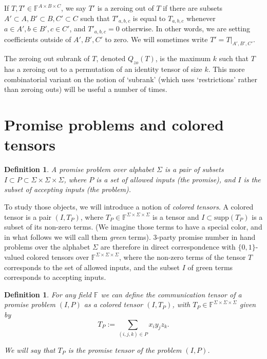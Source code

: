 \documentclass[10pt,a4paper]{article}
\newtheorem{definition}[theorem]{Definition}
\newcommand{\F}{\mathbb{F}}
\newcommand{\supp}{\mathrm{supp}}
\newcommand{\jnote}[1]{\todo[inline, color=blue!30!white]{#1 \\ -\textsc{Jarek}}}
\begin{document}
If $T,T' \in \F^{A \times B \times C}$, we say $T'$ is a zeroing out of $T$ if there are subsets $A' \subset A, B' \subset B, C' \subset C$ such that $T'_{a,b,c}$ is equal to $T_{a,b,c}$ whenever $a \in A', b \in B', c \in C'$, and $T'_{a,b,c} = 0$ otherwise. In other words, we are setting coefficients outside of $A',B',C'$ to zero. We will sometimes write $T' = T|_{A',B',C'}$.

The zeroing out subrank of $T$, denoted $Q_{zo}(T)$, is the maximum $k$ such that $T$ has a zeroing out to a permutation of an identity tensor of size $k$. This more combinatorial variant on the notion of `subrank' (which uses `restrictions' rather than zeroing outs) will be useful a number of times.

\section{Promise problems and colored tensors}


\begin{definition}
A promise problem over alphabet $\Sigma$ is a pair of subsets $I \subset P \subset \Sigma\times\Sigma\times\Sigma$, where $P$ is a set of allowed inputs (the \emph{promise}), and $I$ is the subset of accepting inputs (the \emph{problem}).
\end{definition}

To study those objects, we will introduce a notion of \emph{colored tensors}. A colored tensor is a pair $(I, T_P)$, where $T_P \in \F^{\Sigma \times \Sigma \times \Sigma}$ is a tensor and $I \subset \supp(T_P)$ is a subset of its non-zero terms. (We imagine those terms to have a special color, and in what follows we will call them \emph{green} terms). 3-party promise number in hand problems over the alphabet $\Sigma$ are therefore in direct correspondence with $\{0, 1\}$-valued colored tensors over $\F^{\Sigma \times \Sigma \times \Sigma}$, where the non-zero terms of the tensor $T$ corresponds to the set of allowed inputs, and the subset $I$ of green terms corresponds to accepting inputs.

\begin{definition}
For any field $\F$ we can define the \emph{communication tensor} of a promise problem $(I, P)$ as a colored tensor $(I, T_P)$, with $T_P \in \F^{\Sigma \times \Sigma \times \Sigma}$ given by
\begin{equation*}
    T_P := \sum_{(i,j,k) \in P} x_i y_j z_k.
\end{equation*}

We will say that $T_P$ is the \emph{promise tensor} of the problem $(I, P)$. 
\end{definition}
\end{document}
